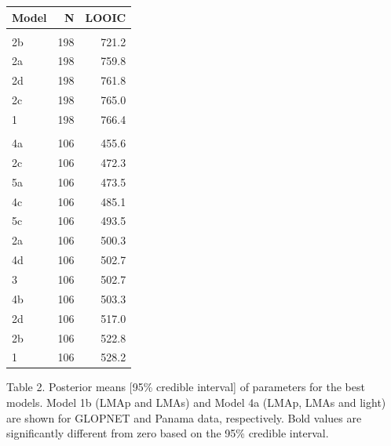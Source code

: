 \documentclass[
  12pt,
  a4paper,
,tablecaptionabove
]{scrartcl}
\begin{document}
\begin{table}
\centering
\begin{tabular}{lrr}
\toprule
Model & N & LOOIC\\
\midrule
\addlinespace[0.3em]
\multicolumn{3}{l}{\textbf{GLOPNET}}\\
\hspace{1em}2b & 198 & 721.2\\
\hspace{1em}2a & 198 & 759.8\\
\hspace{1em}2d & 198 & 761.8\\
\hspace{1em}2c & 198 & 765.0\\
\hspace{1em}1 & 198 & 766.4\\
\addlinespace[0.3em]
\multicolumn{3}{l}{\textbf{Panama}}\\
\hspace{1em}4a & 106 & 455.6\\
\hspace{1em}2c & 106 & 472.3\\
\hspace{1em}5a & 106 & 473.5\\
\hspace{1em}4c & 106 & 485.1\\
\hspace{1em}5c & 106 & 493.5\\
\hspace{1em}2a & 106 & 500.3\\
\hspace{1em}4d & 106 & 502.7\\
\hspace{1em}3 & 106 & 502.7\\
\hspace{1em}4b & 106 & 503.3\\
\hspace{1em}2d & 106 & 517.0\\
\hspace{1em}2b & 106 & 522.8\\
\hspace{1em}1 & 106 & 528.2\\
\bottomrule
\end{tabular}
\end{table}

\newpage

Table 2. Posterior means {[}95\% credible interval{]} of parameters for
the best models. Model 1b (LMAp and LMAs) and Model 4a (LMAp, LMAs and
light) are shown for GLOPNET and Panama data, respectively. Bold values
are significantly different from zero based on the 95\% credible
interval.
\end{document}

